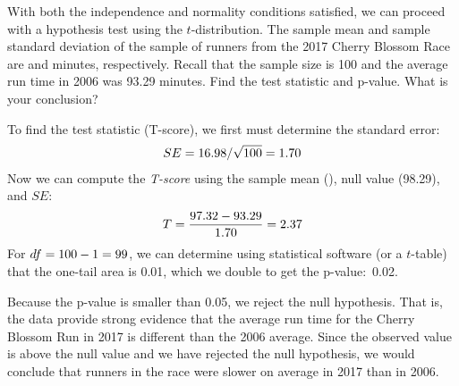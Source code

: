 
\begin{examplewrap}
\begin{nexample}{With both the independence
    and normality conditions satisfied,
    we can proceed with a hypothesis test using
    the $t$-distribution.
    The sample mean and sample standard deviation
    of the sample
    of \cherryblossomn{} runners from the
    2017 Cherry Blossom Race
    are \cherryblossommean{} and \cherryblossomsd{} minutes,
    respectively.
    Recall that the sample size is 100
    and the average run time in 2006 was 93.29 minutes.
    Find the test statistic and p-value.
    What is your conclusion?}

  To find the test statistic (T-score),
  we first must determine the standard error:
  \begin{align*}
  SE
    = 16.98{} / \sqrt{100{}}
    = 1.70{}
  \end{align*}
  Now we can compute the \emph{T-score}
  using the sample mean (\cherryblossommean{}),
  null value (98.29), and $SE$:
  \begin{align*}
  T
    = \frac{97.32{} - 93.29}{1.70{}}
    = 2.37{}
  \end{align*}
  For $df = 100{} - 1 = 99$,
  we can determine using statistical software
  (or a $t$-table) that the one-tail area is 0.01,
  which we double to get the p-value:~0.02.

  Because the p-value is smaller than 0.05,
  we reject the null hypothesis.
  That is, the data provide strong evidence that the average
  run time for the Cherry Blossom Run in 2017 is different
  than the 2006 average.
  Since the observed value is above the null value
  and we have rejected the null hypothesis, we would conclude
  that runners in the race were slower on average in 2017
  than in 2006.
\end{nexample}
\end{examplewrap}

